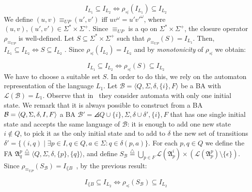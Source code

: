 \[ I_{L_1} \subseteq I_{L_2} \Longleftrightarrow \rho_{\preceq}(I_{L_1}) \subseteq I_{L_2}\]
We define $(u,v) \equiv_{UP} (u',v')$ iff $uv^{\omega} = u' v'^{\omega}$,
where $(u,v), (u',v') \in \Sigma^* \times \Sigma^+$.
Since $\equiv_{UP}$ is a qo on $\Sigma^* \times \Sigma^+$, the closure operator
$\rho_{\equiv_{UP}}$ is well-defined.
Let $S \subseteq \Sigma^* \times \Sigma^+$ such that $\rho_{\equiv_{UP}}(S) = I_{L_1}$.
Then, $I_{L_1} \subseteq I_{L_2} \Longleftrightarrow S \subseteq I_{L_2}$
\cite{ganty2020omegalang}.
Since $\rho_{\preceq}(I_{L_2}) = I_{L_2}$ and by \emph{monotonicity} of
$\rho_{\preceq}$ we obtain:

\[ I_{L_1} \subseteq I_{L_2} \Longleftrightarrow \rho_{\preceq}(S) \subseteq I_{L_2} \]
We have to choose a suitable set $S$.
In order to do this, we rely on the automaton representation of the language $L_1$.
Let $\mathcal{B} = \langle Q, \Sigma, \delta, \{i\}, F \rangle$ be a BA with
$\mathcal{L}(\mathcal{B}) = L_1$.
Observe that in~\cite{ganty2020omegalang} they consider automata with only one
initial state.
We remark that it is always possible to construct from a BA $\mathcal{B}=\langle Q, \Sigma, \delta, I, F\rangle$ a
BA $\mathcal{B}' = \angles{Q \cup \{i\}, \Sigma, \delta \cup \delta', \{i\}, F}$
that has one single initial state and
accepts the same language of $\mathcal{B}$:
it is enough to add one new state $i \notin Q$,
to pick it as the only initial state and to add to $\delta$ the new
set of transitions $\delta' = \{(i,q) \;|\; \exists p \in I, q \in Q, a \in \Sigma:
q \in \delta(p,a)\}$.
For each $p,q \in Q$ we define the FA
$\mathfrak{A}_q^p \overset{\triangle}{=} \langle Q, \Sigma, \delta, \{p\}, \{q\}\rangle$,
and define $S_{\mathcal{B}} \overset{\triangle}{=} \bigcup_{p \in F}
\mathcal{L}(\mathfrak{A}^i_p) \times (\mathcal{L}(\mathfrak{A}^p_p)\setminus\{\epsilon\})$.
Since $\rho_{\equiv_{UP}} (S_{\mathcal{B}}) = I_{\lang{B}}$~\cite{ganty2020omegalang},
by the previous result:

\[ I_{\lang{B}} \subseteq I_{L_2} \Longleftrightarrow \rho_{\preceq}(S_{\mathcal{B}}) \subseteq I_{L_2} \]

